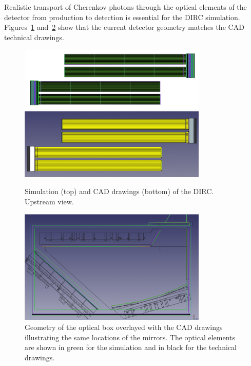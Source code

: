Realistic transport of Cherenkov photons through the optical elements of the detector from production to detection is essential for the DIRC simulation. Figures~\ref{pic:dirc} and~\ref{pic:obg} show that the current detector geometry matches the CAD technical drawings.

\begin{figure}[!h]
\centering
\includegraphics[width=0.8\textwidth]{pics/bars1.png}\\
\includegraphics[width=0.8\textwidth]{pics/bars2.png}
\caption{\label{pic:dirc}
Simulation (top) and CAD drawings (bottom) of the \gluex DIRC. Upstream view.
}
\end{figure} 

\begin{figure}[!h]
\centering
\includegraphics[width=0.8\textwidth]{pics/obgeom.png}
\caption{\label{pic:obg}
Geometry of the optical box overlayed with the CAD drawings illustrating the same locations of the mirrors. The optical elements are shown in green for the simulation and in black for the technical drawings.
}
\end{figure}

